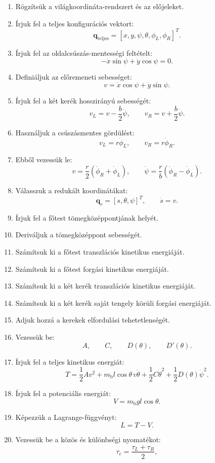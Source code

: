 \documentclass[12pt,a4paper]{article}
\newcommand{\mbody}{m_{\mathrm{b}}}
\begin{document}
	\begin{enumerate}[leftmargin=2em]
		\item Rögzítsük a világkoordináta-rendszert és az előjeleket.
		\item Írjuk fel a teljes konfigurációs vektort:
		\[
		\bm q_{\mathrm{teljes}}=[x,y,\psi,\theta,\phi_L,\phi_R]^T.
		\]
		\item Írjuk fel az oldalcsúszás-mentességi feltételt:
		\[
		-\dot x\sin\psi+\dot y\cos\psi=0.
		\]
		\item Definiáljuk az előremeneti sebességet:
		\[
		v=\dot x\cos\psi+\dot y\sin\psi.
		\]
		\item Írjuk fel a két kerék hosszirányú sebességét:
		\[
		v_L=v-\frac{b}{2}\dot\psi,
		\qquad
		v_R=v+\frac{b}{2}\dot\psi.
		\]
		\item Használjuk a csúszásmentes gördülést:
		\[
		v_L=r\dot\phi_L,
		\qquad
		v_R=r\dot\phi_R.
		\]
		\item Ebből vezessük le:
		\[
		v=\frac{r}{2}(\dot\phi_R+\dot\phi_L),
		\qquad
		\dot\psi=\frac{r}{b}(\dot\phi_R-\dot\phi_L).
		\]
		\item Válasszuk a redukált koordinátákat:
		\[
		\bm q_r=[s,\theta,\psi]^T,
		\qquad
		\dot s=v.
		\]
		\item Írjuk fel a főtest tömegközéppontjának helyét.
		\item Deriváljuk a tömegközéppont sebességét.
		\item Számítsuk ki a főtest transzlációs kinetikus energiáját.
		\item Számítsuk ki a főtest forgási kinetikus energiáját.
		\item Számítsuk ki a két kerék transzlációs kinetikus energiáját.
		\item Számítsuk ki a két kerék saját tengely körüli forgási energiáját.
		\item Adjuk hozzá a kerekek elfordulási tehetetlenségét.
		\item Vezessük be:
		\[
		A,\qquad C,\qquad D(\theta),\qquad D'(\theta).
		\]
		\item Írjuk fel a teljes kinetikus energiát:
		\[
		T=\frac12Av^2+\mbody l\cos\theta\,v\dot\theta
		+\frac12C\dot\theta^2
		+\frac12D(\theta)\dot\psi^2.
		\]
		\item Írjuk fel a potenciális energiát:
		\[
		V=\mbody gl\cos\theta.
		\]
		\item Képezzük a Lagrange-függvényt:
		\[
		L=T-V.
		\]
		\item Vezessük be a közös és különbségi nyomatékot:
		\[
		\tau_c=\frac{\tau_L+\tau_R}{2},
\]
\end{enumerate}
\end{document}
